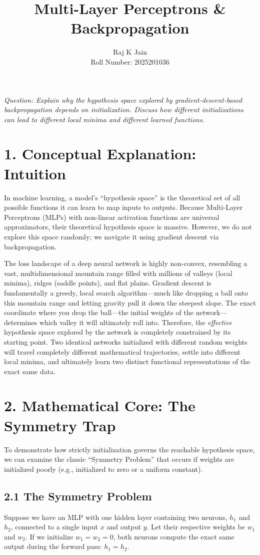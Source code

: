 \documentclass[11pt,a4paper]{article}
\title{\textbf{Multi-Layer Perceptrons \& Backpropagation}}
\author{Raj K Jain \\ Roll Number: 2025201036}
\date{}
\begin{document}
\maketitle
\vspace{-0.5em}
\noindent\textit{Question: Explain why the hypothesis space explored by gradient-descent-based backpropagation depends on initialization. Discuss how different initializations can lead to different local minima and different learned functions.}

\section*{1. Conceptual Explanation: Intuition}
In machine learning, a model's ``hypothesis space'' is the theoretical set of all possible functions it can learn to map inputs to outputs. Because Multi-Layer Perceptrons (MLPs) with non-linear activation functions are universal approximators, their theoretical hypothesis space is massive. However, we do not explore this space randomly; we navigate it using gradient descent via backpropagation.

The loss landscape of a deep neural network is highly non-convex, resembling a vast, multidimensional mountain range filled with millions of valleys (local minima), ridges (saddle points), and flat plains. Gradient descent is fundamentally a greedy, local search algorithm---much like dropping a ball onto this mountain range and letting gravity pull it down the steepest slope. The exact coordinate where you drop the ball---the initial weights of the network---determines which valley it will ultimately roll into. Therefore, the \textit{effective} hypothesis space explored by the network is completely constrained by its starting point. Two identical networks initialized with different random weights will travel completely different mathematical trajectories, settle into different local minima, and ultimately learn two distinct functional representations of the exact same data.

\section*{2. Mathematical Core: The Symmetry Trap}
To demonstrate how strictly initialization governs the reachable hypothesis space, we can examine the classic ``Symmetry Problem'' that occurs if weights are initialized poorly (e.g., initialized to zero or a uniform constant).

\subsection*{2.1 The Symmetry Problem}
Suppose we have an MLP with one hidden layer containing two neurons, $h_1$ and $h_2$, connected to a single input $x$ and output $y$. Let their respective weights be $w_1$ and $w_2$. If we initialize $w_1 = w_2 = 0$, both neurons compute the exact same output during the forward pass: $h_1 = h_2$.
\end{document}
